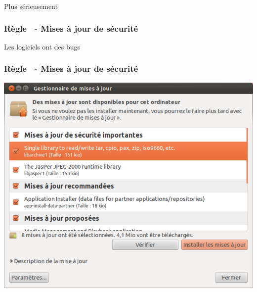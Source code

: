\documentclass{beamer}
\newcounter{moncompteur}
\begin{document}
\begin{frame}
\begin{center}
\Huge{Plus sérieusement}
\end{center}
\end{frame}

\begin{frame}

\frametitle{Règle  \themoncompteur \  - Mises à jour de sécurité}

\begin{block}{Les logiciels ont des bugs}
\begin{itemize}
\end{itemize}
\end{block}
\end{frame}

\begin{frame}
\frametitle{Règle \themoncompteur \  - Mises à jour de sécurité}
\begin{center}
\includegraphics[scale=0.3] {./images/Maj02.png}
\end{center}
\end{frame}
\end{document}
